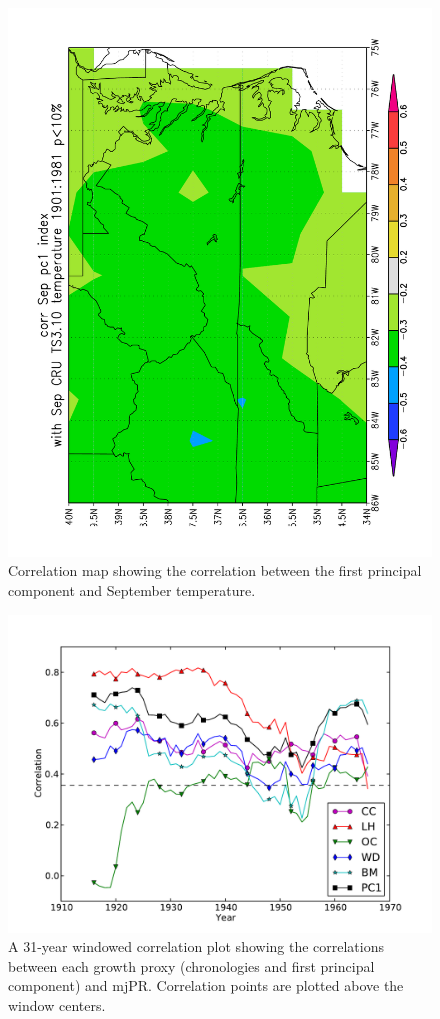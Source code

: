 \begin{figure}
\centering
\includegraphics[width=5in, angle=-90]{figures/corrMapTempSept.pdf}
\caption{Correlation map showing the correlation between the first principal component and September temperature.}
\label{fig:tempCorrMap}
\end{figure}

\begin{figure}
\centering
\includegraphics[width=5in]{figures/precipRunningCorr.pdf}
\caption{A 31-year windowed correlation plot showing the correlations between each growth proxy (chronologies and first principal component) and mjPR. Correlation points are plotted above the window centers.}
\label{fig:precipRunningCorr}
\end{figure}

